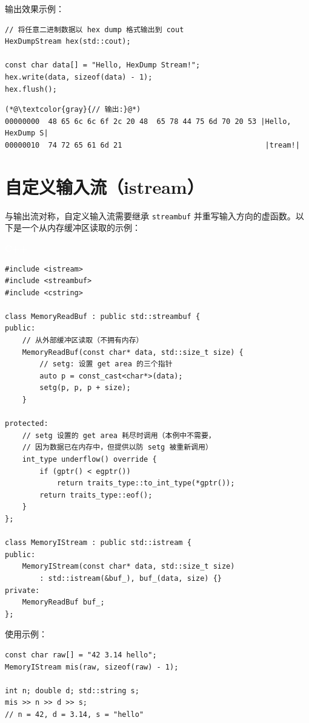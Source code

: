 \documentclass[12pt,a4paper,fontset=fandol]{ctexbook}
\newcommand{\Tp}[1]{\texttt{#1}}
\newcommand{\cpplabel}{%
  \noindent\begin{tcolorbox}[sharp corners,colback=algheadbg,colframe=algheadbg,
    left=6pt,right=6pt,top=2pt,bottom=2pt,boxrule=0pt]
  \textcolor{white}{\small\bfseries\sffamily C++}\end{tcolorbox}%
}
\begin{document}
输出效果示例：

\begin{lstlisting}
// 将任意二进制数据以 hex dump 格式输出到 cout
HexDumpStream hex(std::cout);

const char data[] = "Hello, HexDump Stream!";
hex.write(data, sizeof(data) - 1);
hex.flush();
\end{lstlisting}

\begin{lstlisting}
(*@\textcolor{gray}{// 输出:}@*)
00000000  48 65 6c 6c 6f 2c 20 48  65 78 44 75 6d 70 20 53 |Hello, HexDump S|
00000010  74 72 65 61 6d 21                                 |tream!|
\end{lstlisting}

\section{自定义输入流（istream）}

与输出流对称，自定义输入流需要继承 \Tp{streambuf} 并重写输入方向的虚函数。以下是一个从内存缓冲区读取的示例：

\cpplabel
\begin{lstlisting}
#include <istream>
#include <streambuf>
#include <cstring>

class MemoryReadBuf : public std::streambuf {
public:
    // 从外部缓冲区读取（不拥有内存）
    MemoryReadBuf(const char* data, std::size_t size) {
        // setg: 设置 get area 的三个指针
        auto p = const_cast<char*>(data);
        setg(p, p, p + size);
    }

protected:
    // setg 设置的 get area 耗尽时调用（本例中不需要，
    // 因为数据已在内存中，但提供以防 setg 被重新调用）
    int_type underflow() override {
        if (gptr() < egptr())
            return traits_type::to_int_type(*gptr());
        return traits_type::eof();
    }
};

class MemoryIStream : public std::istream {
public:
    MemoryIStream(const char* data, std::size_t size)
        : std::istream(&buf_), buf_(data, size) {}
private:
    MemoryReadBuf buf_;
};
\end{lstlisting}

使用示例：

\begin{lstlisting}
const char raw[] = "42 3.14 hello";
MemoryIStream mis(raw, sizeof(raw) - 1);

int n; double d; std::string s;
mis >> n >> d >> s;
// n = 42, d = 3.14, s = "hello"
\end{lstlisting}
\end{document}
